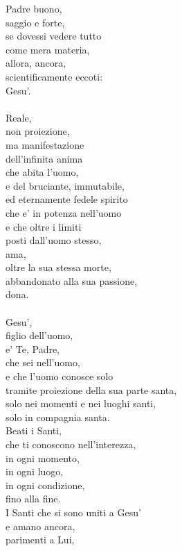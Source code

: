 \begin{haiku}
Padre buono,\\
saggio e forte,\\
se dovessi vedere tutto \\
come mera materia,\\
allora, ancora, \\
    scientificamente eccoti:\\
    Gesu'.\\
    \leavevmode\\
Reale,\\
    non proiezione, \\
    ma manifestazione \\
dell'infinita anima \\
che abita l'uomo,\\
e del bruciante, immutabile, \\
ed eternamente fedele spirito\\
che e' in potenza nell'uomo\\
e che oltre i limiti \\
    posti dall'uomo stesso,\\
ama,\\
oltre la sua stessa morte,\\
abbandonato alla sua passione,\\
dona.\\
    \leavevmode\\
Gesu',\\
figlio dell'uomo,\\
e' Te, Padre,\\
che sei nell'uomo,\\
e che l'uomo conosce solo\\
tramite proiezione della sua parte santa,\\
solo nei momenti e nei luoghi santi,\\
solo in compagnia santa.\\
Beati i Santi,\\
che ti conoscono nell'interezza,\\
in ogni momento,\\
in ogni luogo,\\
in ogni condizione,\\
fino alla fine.\\
I Santi che si sono uniti a Gesu'\\
e amano ancora,\\
parimenti a Lui,\\

\end{haiku}
